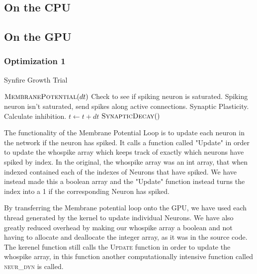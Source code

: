 \documentclass[a4paper]{article}
\begin{document}
\subsection{On the CPU}


\subsection{On the GPU}

\subsubsection{Optimization 1}

\begin{algorithm}[H]
\caption{Synfire Growth Trial}
\label{alg:syn}
\begin{algorithmic}
	\State $\textsc{MembranePotential}(dt)$
		\State Check to see if spiking neuron is saturated.
		\State Spiking neuron isn't saturated, send spikes along active connections.
		\State Synaptic Plasticity.
	\EndFor
		\State Calculate inhibition.
	\EndFor
	\State $t \gets t + dt$
\EndWhile
\State $\textsc{SynapticDecay}()$
\end{algorithmic}
\end{algorithm}

The functionality of the Membrane Potential Loop is to update each neuron in the network if the neuron has spiked.  It calls a function called "Update" in order to update the whospike array which keeps track of exactly which neurons have spiked by index. In the original, the whospike array was an int array, that when indexed contained each of the indexes of Neurons that have spiked. We have instead made this a boolean array and the "Update" function instead turns the index into a 1 if the corresponding Neuron has spiked.

By transferring the Membrane potential loop onto the GPU, we have used each thread generated by the kernel to update individual Neurons. We have also greatly reduced overhead by making our whospike array a boolean and not having to allocate and deallocate the integer array, as it was in the source code. The kerenel function still calls the \textsc{Update} function in order to update the whospike array, in this function another computationally intensive function called \textsc{neur\_dyn} is called.
\end{document}
